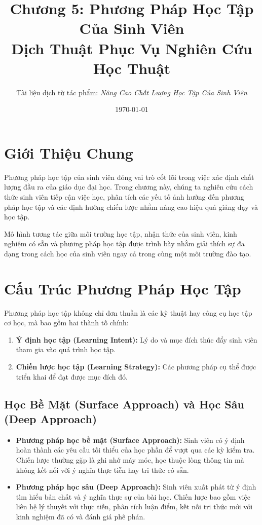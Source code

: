\documentclass[12pt,a4paper]{article}
\title{\textbf{Chương 5: Phương Pháp Học Tập Của Sinh Viên}\\
\large Dịch Thuật Phục Vụ Nghiên Cứu Học Thuật}
\author{Tài liệu dịch từ tác phẩm: \textit{Nâng Cao Chất Lượng Học Tập Của Sinh Viên}}
\date{\today}
\begin{document}
\maketitle

\tableofcontents
\newpage

\section{Giới Thiệu Chung}

Phương pháp học tập của sinh viên đóng vai trò cốt lõi trong việc xác định chất lượng đầu ra của giáo dục đại học. Trong chương này, chúng ta nghiên cứu cách thức sinh viên tiếp cận việc học, phân tích các yếu tố ảnh hưởng đến phương pháp học tập và các định hướng chiến lược nhằm nâng cao hiệu quả giảng dạy và học tập.

Mô hình tương tác giữa môi trường học tập, nhận thức của sinh viên, kinh nghiệm có sẵn và phương pháp học tập được trình bày nhằm giải thích sự đa dạng trong cách học của sinh viên ngay cả trong cùng một môi trường đào tạo.

\section{Cấu Trúc Phương Pháp Học Tập}

Phương pháp học tập không chỉ đơn thuần là các kỹ thuật hay công cụ học tập cơ học, mà bao gồm hai thành tố chính:
\begin{enumerate}
    \item \textbf{Ý định học tập (Learning Intent):} Lý do và mục đích thúc đẩy sinh viên tham gia vào quá trình học tập.
    \item \textbf{Chiến lược học tập (Learning Strategy):} Các phương pháp cụ thể được triển khai để đạt được mục đích đó.
\end{enumerate}

\subsection{Học Bề Mặt (Surface Approach) và Học Sâu (Deep Approach)}

\begin{itemize}
    \item \textbf{Phương pháp học bề mặt (Surface Approach):}
    Sinh viên có ý định hoàn thành các yêu cầu tối thiểu của học phần để vượt qua các kỳ kiểm tra. Chiến lược thường gặp là ghi nhớ máy móc, học thuộc lòng thông tin mà không kết nối với ý nghĩa thực tiễn hay tri thức có sẵn.

    \item \textbf{Phương pháp học sâu (Deep Approach):}
    Sinh viên xuất phát từ ý định tìm hiểu bản chất và ý nghĩa thực sự của bài học. Chiến lược bao gồm việc liên hệ lý thuyết với thực tiễn, phân tích luận điểm, kết nối tri thức mới với kinh nghiệm đã có và đánh giá phê phán.
\end{itemize}
\end{document}
